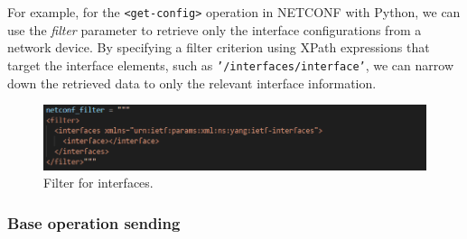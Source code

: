 For example, for the \texttt{<get-config>} operation in NETCONF with Python, we can use the \textit{filter} parameter to retrieve only the interface configurations from a network device. By specifying a filter criterion using XPath expressions that target the interface elements, such as \texttt{'/interfaces/interface'}, we can narrow down the retrieved data to only the relevant interface information.

\begin{figure}[h]
    \centering
    \includegraphics[width=0.8\linewidth]{Images/filter_int.png}
    \caption{Filter for interfaces.}
\end{figure}
\subsubsection{Base operation sending}